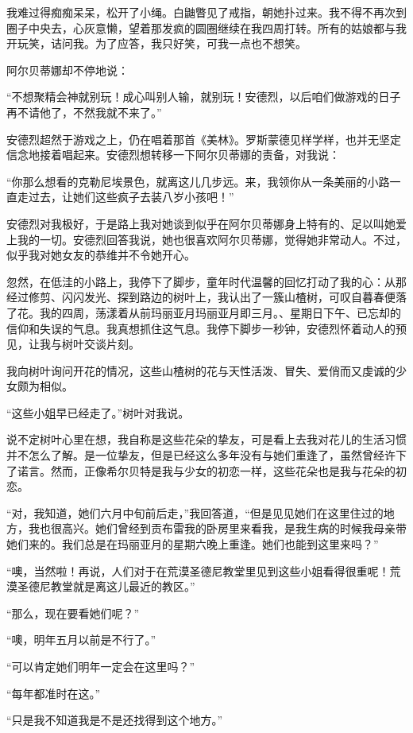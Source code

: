 \par 我难过得痴痴呆呆，松开了小绳。白鼬瞥见了戒指，朝她扑过来。我不得不再次到圈子中央去，心灰意懒，望着那发疯的圆圈继续在我四周打转。所有的姑娘都与我开玩笑，诘问我。为了应答，我只好笑，可我一点也不想笑。
\par 阿尔贝蒂娜却不停地说：
\par “不想聚精会神就别玩！成心叫别人输，就别玩！安德烈，以后咱们做游戏的日子再不请他了，不然我就不来了。”
\par 安德烈超然于游戏之上，仍在唱着那首《美林》。罗斯蒙德见样学样，也并无坚定信念地接着唱起来。安德烈想转移一下阿尔贝蒂娜的责备，对我说：
\par “你那么想看的克勒尼埃景色，就离这儿几步远。来，我领你从一条美丽的小路一直走过去，让她们这些疯子去装八岁小孩吧！”
\par 安德烈对我极好，于是路上我对她谈到似乎在阿尔贝蒂娜身上特有的、足以叫她爱上我的一切。安德烈回答我说，她也很喜欢阿尔贝蒂娜，觉得她非常动人。不过，似乎我对她女友的恭维并不令她开心。
\par 忽然，在低洼的小路上，我停下了脚步，童年时代温馨的回忆打动了我的心：从那经过修剪、闪闪发光、探到路边的树叶上，我认出了一簇山楂树，可叹自暮春便落了花。我的四周，荡漾着从前玛丽亚月玛丽亚月即三月。、星期日下午、已忘却的信仰和失误的气息。我真想抓住这气息。我停下脚步一秒钟，安德烈怀着动人的预见，让我与树叶交谈片刻。
\par 我向树叶询问开花的情况，这些山楂树的花与天性活泼、冒失、爱俏而又虔诚的少女颇为相似。
\par “这些小姐早已经走了。”树叶对我说。
\par 说不定树叶心里在想，我自称是这些花朵的挚友，可是看上去我对花儿的生活习惯并不怎么了解。是一位挚友，但是已经这么多年没有与她们重逢了，虽然曾经许下了诺言。然而，正像希尔贝特是我与少女的初恋一样，这些花朵也是我与花朵的初恋。
\par “对，我知道，她们六月中旬前后走，”我回答道，“但是见见她们在这里住过的地方，我也很高兴。她们曾经到贡布雷我的卧房里来看我，是我生病的时候我母亲带她们来的。我们总是在玛丽亚月的星期六晚上重逢。她们也能到这里来吗？”
\par “噢，当然啦！再说，人们对于在荒漠圣德尼教堂里见到这些小姐看得很重呢！荒漠圣德尼教堂就是离这儿最近的教区。”
\par “那么，现在要看她们呢？”
\par “噢，明年五月以前是不行了。”
\par “可以肯定她们明年一定会在这里吗？”
\par “每年都准时在这。”
\par “只是我不知道我是不是还找得到这个地方。”
